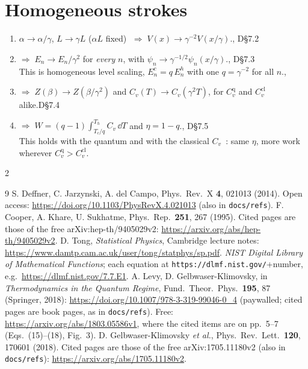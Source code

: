 \documentclass[10pt]{article}
\newcommand{\Cq}{C_v^{\mathrm{q}}}
\newcommand{\Ccl}{C_v^{\mathrm{cl}}}
\newcommand{\D}[1]{\textsf{D\S#1}}
\begin{document}
\section{Homogeneous strokes}
\begin{enumerate}[label=(\roman*),itemsep=2pt]
\item $\alpha\to\alpha/\gamma$, $L\to\gamma L$ ($\alpha L$ fixed) $\;\Rightarrow\;V(x)\to\gamma^{-2}V(x/\gamma)$.\hfill\cite[p.~021013-2 Eq.~(3), p.~021013-9 Table~I]{deffner}, \D{7.2}
\item $\Rightarrow\;E_n\to E_n/\gamma^2$ for \emph{every} $n$, with $\psi_n\to\gamma^{-1/2}\psi_n(x/\gamma)$.\hfill\cite[p.~021013-14, App.~A]{deffner}, \D{7.3}\\
This is homogeneous level scaling, $E_n^{c}=q\,E_n^{h}$ with one $q=\gamma^{-2}$ for all $n$.\hfill\cite[p.~92]{LGK},~\cite[p.~2]{GK}
\item $\Rightarrow\;Z(\beta)\to Z(\beta/\gamma^2)$ and $C_v(T)\to C_v(\gamma^2T)$, for $\Cq$ and $\Ccl$ alike.\hfill\D{7.4}
\item $\Rightarrow\;W=(q-1)\int_{T_c/q}^{T_h}C_v\,\dd T$ and $\eta=1-q$.\hfill\cite[pp.~94--96, Eqs.~(4.15)--(4.18)]{LGK}, \D{7.5}\\
This holds with the quantum and with the classical $C_v$~\cite[p.~2, Eq.~(2)]{GK}: same $\eta$, more work wherever $\Cq>\Ccl$.
\end{enumerate}

\vspace{-1mm}
{\scriptsize
\begin{multicols}{2}
\begin{thebibliography}{9}\setlength{\itemsep}{-1pt}
 S. Deffner, C. Jarzynski, A. del Campo, Phys.\ Rev.\ X \textbf{4}, 021013 (2014). Open access: \url{https://doi.org/10.1103/PhysRevX.4.021013} (also in \texttt{docs/refs}).
 F. Cooper, A. Khare, U. Sukhatme, Phys.\ Rep.\ \textbf{251}, 267 (1995). Cited pages are those of the free arXiv:hep-th/9405029v2: \url{https://arxiv.org/abs/hep-th/9405029v2}.
 D. Tong, \emph{Statistical Physics}, Cambridge lecture notes: \url{https://www.damtp.cam.ac.uk/user/tong/statphys/sp.pdf}.
 \emph{NIST Digital Library of Mathematical Functions}; each equation at \texttt{https://dlmf.nist.gov/}+number, e.g.\ \url{https://dlmf.nist.gov/7.7.E1}.
 A. Levy, D. Gelbwaser-Klimovsky, in \emph{Thermodynamics in the Quantum Regime}, Fund.\ Theor.\ Phys.\ \textbf{195}, 87 (Springer, 2018): \url{https://doi.org/10.1007/978-3-319-99046-0_4} (paywalled; cited pages are book pages, as in \texttt{docs/refs}). Free: \url{https://arxiv.org/abs/1803.05586v1}, where the cited items are on pp.~5--7 (Eqs.~(15)--(18), Fig.~3).
 D. Gelbwaser-Klimovsky \emph{et al.}, Phys.\ Rev.\ Lett.\ \textbf{120}, 170601 (2018). Cited pages are those of the free arXiv:1705.11180v2 (also in \texttt{docs/refs}): \url{https://arxiv.org/abs/1705.11180v2}.
\end{thebibliography}
\end{multicols}}
\end{document}
